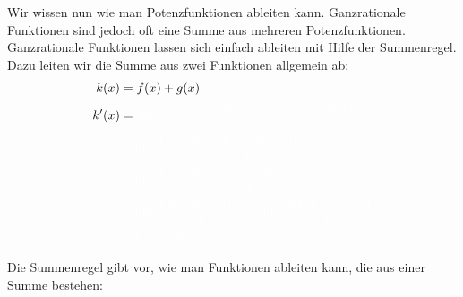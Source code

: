 Wir wissen nun wie man Potenzfunktionen ableiten kann. Ganzrationale Funktionen sind jedoch oft eine Summe aus mehreren Potenzfunktionen. Ganzrationale Funktionen lassen sich einfach ableiten mit Hilfe der Summenregel. Dazu leiten wir die Summe aus zwei Funktionen allgemein ab:
\begin{align*}
	k(x)&=f(x)+g(x)\\
	k'(x)&=\textcolor{loes}{\lim\limits_{h\to 0}\frac{f(x+h)+g(x+h)-(f(x)+g(x)}{h}}\\
	&\textcolor{loes}{=\lim\limits_{h\to 0}\frac{f(x+h)+g(x+h)-f(x)-g(x}{h}}\\
	&\textcolor{loes}{=\lim\limits_{h\to 0}\frac{f(x+h)-f(x)+g(x+h)-g(x)}{h}}\\
	&\textcolor{loes}{=\lim\limits_{h\to 0}\frac{f(x+h)-f(x)}{h}+\lim\limits_{h\to 0}\frac{g(x+h)-g(x)}{h}}\\
	&\textcolor{loes}{=f'(x)+g'(x)}
\end{align*}

\vspace{2cm}

Die Summenregel gibt vor, wie man Funktionen ableiten kann, die aus einer Summe bestehen:

\bigskip

